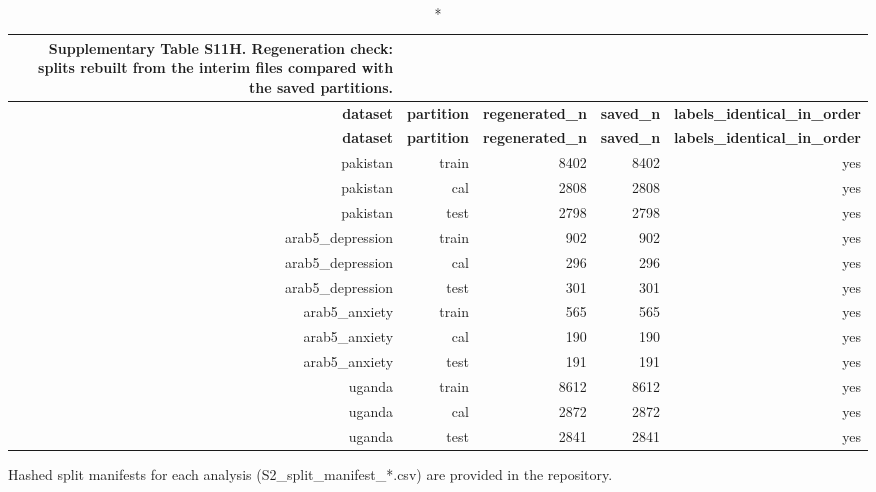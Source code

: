 \documentclass[10pt]{article}
\begin{document}
\tiny
\setlength{\tabcolsep}{2pt}
\begin{longtable}{rrrrr}
\caption*{\textbf{Supplementary Table S11H.} Regeneration check: splits rebuilt from the interim files compared with the saved partitions.}\\
\toprule
\textbf{dataset} & \textbf{partition} & \textbf{regenerated\_n} & \textbf{saved\_n} & \textbf{labels\_identical\_in\_order} \\
\midrule
\endfirsthead
\toprule
\textbf{dataset} & \textbf{partition} & \textbf{regenerated\_n} & \textbf{saved\_n} & \textbf{labels\_identical\_in\_order} \\
\midrule
\endhead
\bottomrule
\endfoot
pakistan & train & 8402 & 8402 & yes \\
pakistan & cal & 2808 & 2808 & yes \\
pakistan & test & 2798 & 2798 & yes \\
arab5\_depression & train & 902 & 902 & yes \\
arab5\_depression & cal & 296 & 296 & yes \\
arab5\_depression & test & 301 & 301 & yes \\
arab5\_anxiety & train & 565 & 565 & yes \\
arab5\_anxiety & cal & 190 & 190 & yes \\
arab5\_anxiety & test & 191 & 191 & yes \\
uganda & train & 8612 & 8612 & yes \\
uganda & cal & 2872 & 2872 & yes \\
uganda & test & 2841 & 2841 & yes \\
\bottomrule
\end{longtable}
\normalsize

\noindent Hashed split manifests for each analysis (S2\_split\_manifest\_*.csv) are provided in the repository.
\end{document}
